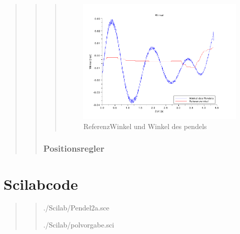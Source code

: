 \begin{quote}
\begin{quote}
\begin{quote}
            \begin{figure}[H]
            \centering
                \includegraphics[scale=0.7, trim = 0cm 0cm 0cm 0cm, clip]{Bilder/win_win_ref}
                    \caption{ReferenzWinkel und Winkel des pendels}
                    \label{fig:win_win_ref}
            \end{figure}
            
            
            
            
            
        \end{quote}%
        
        \subsubsection{Positionsregler}
        \begin{quote}
            
        \end{quote}%


        
        
    \end{quote}%


        
    
\end{quote} %


\section{Scilabcode}
\begin{quote}
\begin{quote}
    
        {./Scilab/Pendel2a.sce}
    
        {./Scilab/polvorgabe.sci}

\end{quote}

	
\end{quote} %


